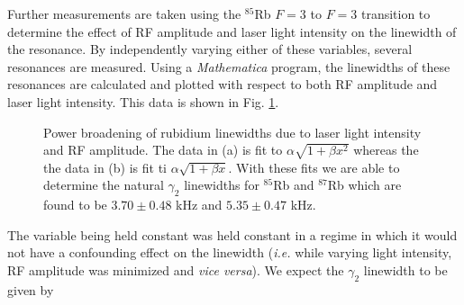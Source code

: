 Further measurements are taken using the $^{85}$Rb $F=3$ to $F=3$ transition to determine the effect of RF amplitude and laser light intensity on the linewidth of the resonance. By independently varying either of these variables, several resonances are measured.  Using a \emph{Mathematica} program, the linewidths of these resonances are calculated and plotted with respect to both RF amplitude and laser light intensity.  This data is shown in Fig. \ref{fig:linewidths}.
\begin{figure}[h!]
\begin{center}
\hspace{-1mm}
\vspace{-2mm}
\vspace{-2mm}
\caption{\small{Power broadening of rubidium linewidths due to laser light intensity and RF amplitude.  The data in (a) is fit to $\alpha \sqrt{1+\beta x^2}$ whereas the the data in (b) is fit ti $\alpha \sqrt{1+\beta x}$.  With these fits we are able to determine the natural $\gamma_2$ linewidths for $^{85}$Rb and $^{87}$Rb which are found to be $3.70 \pm 0.48$ kHz and $5.35 \pm 0.47$ kHz.}}\label{fig:linewidths}
\end{center}
\end{figure}
The variable being held constant was held constant in a regime in which it would not have a confounding effect on the linewidth (\emph{i.e.} while varying light intensity, RF amplitude was minimized and \emph{vice versa}).  We expect the $\gamma_2$ linewidth to be given by 
